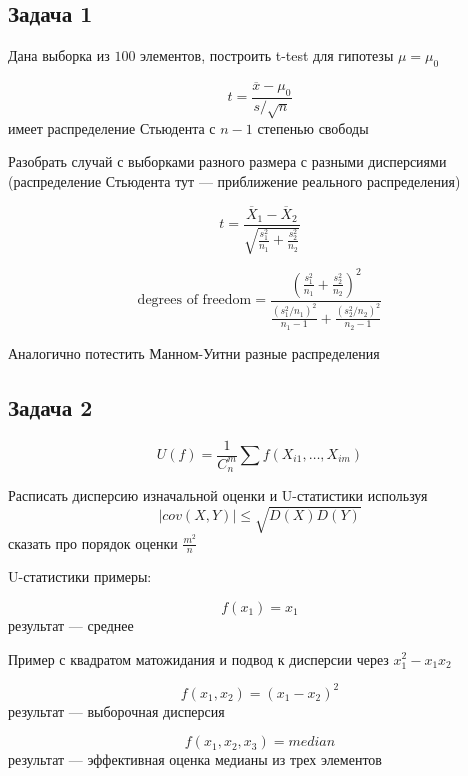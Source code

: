 \documentclass[
paper = a4,
fontsize = 12pt,
headinclude = true,
open = right,
twoside = true,
BCOR = 10mm,
toc = listofnumbered,
toc = bibnumbered,
numbers = noendperiod
]{scrreprt}
\begin{document}
	
	\subsection*{Задача 1}
	
	Дана выборка из $100$ элементов, построить t-test для гипотезы $\mu = \mu_{0}$
	
	$$t = \frac{\overline{x} - \mu_{0}}{s / \sqrt{n}}$$
	имеет распределение Стьюдента с $n - 1$ степенью свободы
	
	Разобрать случай с выборками разного размера с разными дисперсиями (распределение Стьюдента тут --- приближение реального распределения)
	
	$$t = \frac{\overline{X}_{1} - \overline{X}_{2}}{\sqrt{\frac{s_{1}^{2}}{n_{1}} + \frac{s_{2}^{2}}{n_{2}}}}$$
	
	$$\text{degrees~of~freedom} = \frac{\left(\frac{s_{1}^{2}}{n_{1}} + \frac{s_{2}^{2}}{n_{2}}\right)^{2}}{\frac{(s_{1}^{2}/n_{1})^{2}}{n_{1} - 1} + \frac{(s_{2}^{2}/n_{2})^{2}}{n_{2} - 1}}$$
	
	Аналогично потестить Манном-Уитни разные распределения
	
	\subsection*{Задача 2}
	
	$$U(f) = \frac{1}{C_{n}^{m}}\sum f(X_{i1},\dots,X_{im})$$
	
	Расписать дисперсию изначальной оценки и U-статистики используя $$|cov(X, Y)| \leq\sqrt{D(X)D(Y)}$$
	сказать про порядок оценки $\frac{m^{2}}{n}$
	
	U-статистики примеры:
	
	$$f(x_{1}) = x_{1}$$
	результат --- среднее
	
	Пример с квадратом матожидания и подвод к дисперсии через $x_{1}^{2} - x_{1}x_{2}$
	
	$$f(x_{1}, x_{2}) = (x_{1} - x_{2})^{2}$$
	результат --- выборочная дисперсия
	
	$$f(x_{1}, x_{2}, x_{3}) = median$$
	результат --- эффективная оценка медианы из трех элементов
	
\end{document}
